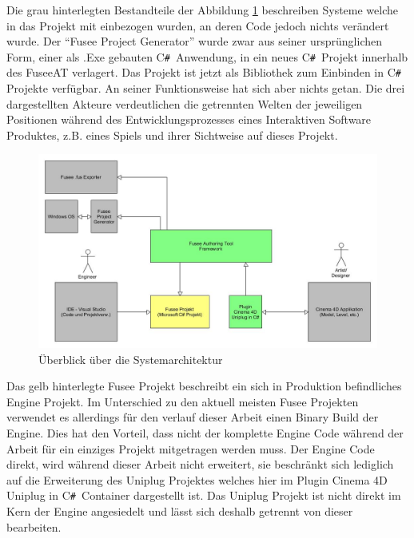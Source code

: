 \documentclass[pagesize, paper=a4, fontsize=12pt, titlepage=true, headings=small, headnosepline, abstractoff, liststotoc, nochapterprefix, plainheadsepline, twoside]{scrreprt}
\newcommand{\CSS}{C\texttt{\# }}
\begin{document}
Die grau hinterlegten Bestandteile der Abbildung \ref{FuseeATSystemÜberblick} beschreiben Systeme welche in das Projekt mit einbezogen wurden, an deren Code jedoch nichts verändert wurde. Der “Fusee Project Generator” wurde zwar aus seiner ursprünglichen Form, einer als .Exe gebauten \CSS Anwendung, in ein neues \CSS Projekt innerhalb des FuseeAT verlagert. Das Projekt ist jetzt als Bibliothek zum Einbinden in \CSS Projekte verfügbar. An seiner Funktionsweise hat sich aber nichts getan. Die drei dargestellten Akteure verdeutlichen die getrennten Welten der jeweiligen Positionen während des Entwicklungsprozesses eines Interaktiven Software Produktes, z.B. eines Spiels und ihrer Sichtweise auf dieses Projekt.
\begin{figure}[ht]
	\centering
	\includegraphics[width=\linewidth]{Bilder/Ueberblick_System.jpg}
	\caption{Überblick über die Systemarchitektur}
	\label{FuseeATSystemÜberblick}
\end{figure}
Das gelb hinterlegte Fusee Projekt beschreibt ein sich in Produktion befindliches Engine Projekt. Im Unterschied zu den aktuell meisten Fusee Projekten verwendet es allerdings für den verlauf dieser Arbeit einen Binary Build der Engine. Dies hat den Vorteil, dass nicht der komplette Engine Code während der Arbeit für ein einziges Projekt mitgetragen werden muss. Der Engine Code direkt, wird während dieser Arbeit nicht erweitert, sie beschränkt sich lediglich auf die Erweiterung des Uniplug Projektes welches hier im Plugin Cinema 4D Uniplug in \CSS Container dargestellt ist. Das Uniplug Projekt ist nicht direkt im Kern der Engine angesiedelt und lässt sich deshalb getrennt von dieser bearbeiten.
\\
\\
\end{document}
